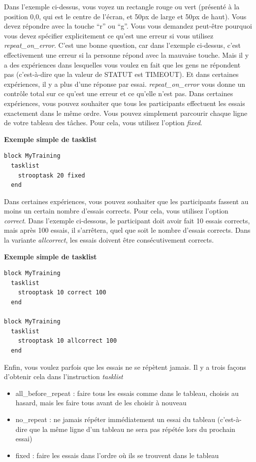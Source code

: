 \documentclass[
]{book}
\providecommand{\tightlist}{%
  \setlength{\itemsep}{0pt}\setlength{\parskip}{0pt}}
\begin{document}
Dans l'exemple ci-dessus, vous voyez un rectangle rouge ou vert
(présenté à la position 0,0, qui est le centre de l'écran, et 50px de
large et 50px de haut). Vous devez répondre avec la touche ``r'' ou
``g''. Vous vous demandez peut-être pourquoi vous devez spécifier
explicitement ce qu'est une erreur si vous utilisez
\emph{repeat\_on\_error}. C'est une bonne question, car dans l'exemple
ci-dessus, c'est effectivement une erreur si la personne répond avec la
mauvaise touche. Mais il y a des expériences dans lesquelles vous voulez
en fait que les gens ne répondent pas (c'est-à-dire que la valeur de
STATUT est TIMEOUT). Et dans certaines expériences, il y a plus d'une
réponse par essai. \emph{repeat\_on\_error} vous donne un contrôle total
sur ce qu'est une erreur et ce qu'elle n'est pas. Dans certaines
expériences, vous pouvez souhaiter que tous les participants effectuent
les essais exactement dans le même ordre. Vous pouvez simplement
parcourir chaque ligne de votre tableau des tâches. Pour cela, vous
utilisez l'option \emph{fixed}.

\textbf{Exemple simple de tasklist}

\begin{verbatim}
block MyTraining
  tasklist
    strooptask 20 fixed
  end
\end{verbatim}

Dans certaines expériences, vous pouvez souhaiter que les participants
fassent au moins un certain nombre d'essais corrects. Pour cela, vous
utilisez l'option \emph{correct}. Dans l'exemple ci-dessous, le
participant doit avoir fait 10 essais corrects, mais après 100 essais,
il s'arrêtera, quel que soit le nombre d'essais corrects. Dans la
variante \emph{allcorrect}, les essais doivent être consécutivement
corrects.

\textbf{Exemple simple de tasklist}

\begin{verbatim}
block MyTraining
  tasklist
    strooptask 10 correct 100
  end

block MyTraining
  tasklist
    strooptask 10 allcorrect 100
  end
\end{verbatim}

Enfin, vous voulez parfois que les essais ne se répètent jamais. Il y a
trois façons d'obtenir cela dans l'instruction \emph{tasklist}

\begin{itemize}
\tightlist
\item
  all\_before\_repeat : faire tous les essais comme dans le tableau,
  choisis au hasard, mais les faire tous avant de les choisir à nouveau
\item
  no\_repeat : ne jamais répéter immédiatement un essai du tableau
  (c'est-à-dire que la même ligne d'un tableau ne sera pas répétée lors
  du prochain essai)
\item
  fixed : faire les essais dans l'ordre où ils se trouvent dans le
  tableau
\end{itemize}
\end{document}
